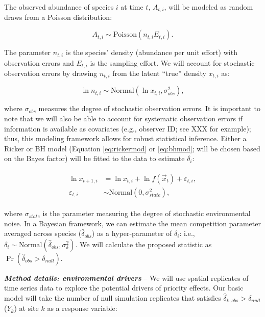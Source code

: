\documentclass[12pt, class=article, crop=false]{standalone}
\begin{document}
The observed abundance of species $i$ at time $t$, $A_{t,i}$, will be modeled as random draws from a Poisson distribution:

\begin{equation}
    A_{t,i} \sim \mbox{Poisson}(n_{t,i} E_{t,i}).
\end{equation}

The parameter $n_{t,i}$ is the species' density (abundance per unit effort) with observation errors and $E_{t,i}$ is the sampling effort.
We will account for stochastic observation errors by drawing $n_{t,i}$ from the latent ``true'' density $x_{t,i}$ as:

\begin{equation}
    \ln n_{t,i} \sim \mbox{Normal}(\ln x_{t,i}, \sigma^2_{obs}),
\end{equation}

where $\sigma_{obs}$ measures the degree of stochastic observation errors.
It is important to note that we will also be able to account for systematic observation errors if information is available as covariates (e.g., observer ID; see XXX for example); thus, this modeling framework allows for robust statistical inference.
Either a Ricker or BH model (Equation \ref{eq:rickermod} or \ref{eq:bhmod}; will be chosen based on the Bayes factor) will be fitted to the data to estimate $\delta_i$:

\begin{align}
\begin{split}
    \ln x_{t + 1,i} &= \ln x_{t,i} + \ln f(\overset{\rightarrow}{x}_{t}) + \varepsilon_{t,i},\\
    \varepsilon_{t,i} &\sim \mbox{Normal}(0, \sigma^2_{state}),
\end{split}
\end{align}

where $\sigma_{state}$ is the parameter measuring the degree of stochastic environmental noise.
In a Bayesian framework, we can estimate the mean competition parameter averaged across species ($\hat{\delta}_{obs}$) as a hyper-parameter of $\delta_i$: i.e., $\delta_i \sim \mbox{Normal}(\hat{\delta}_{obs}, \sigma^2_{\delta})$.
We will calculate the proposed statistic as $\Pr(\hat{\delta}_{obs} > \delta_{null})$.

\textit{\textbf{Method details: environmental drivers}} --
We will use spatial replicates of time series data to explore the potential drivers of priority effects.
Our basic model will take the number of null simulation replicates that satisfies $\hat{\delta}_{k,obs} > \delta_{null}$ ($Y_k$) at site $k$ as a response variable:
\end{document}
